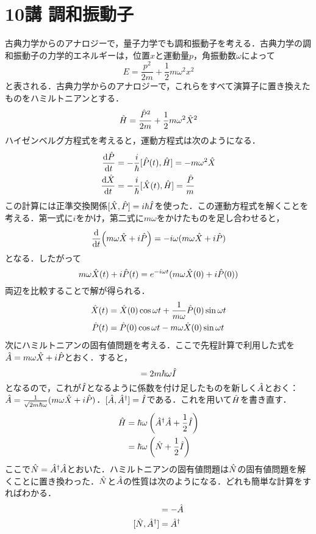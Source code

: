 \documentclass[a4paper,10pt,uplatex]{jsarticle}
\begin{document}
\section{10講 調和振動子}
古典力学からのアナロジーで，量子力学でも調和振動子を考える．古典力学の調和振動子の力学的エネルギーは，位置$x$と運動量$p$，角振動数$\omega$によって
\begin{equation}
    E = \frac{p^2}{2m} + \frac{1}{2} m\omega^2x^2
\end{equation}
と表される．古典力学からのアナロジーで，これらをすべて演算子に置き換えたものをハミルトニアンとする．
\begin{equation}
    \hat{H} = \frac{\hat{P}^2}{2m} + \frac{1}{2} m\omega^2\hat{X}^2
\end{equation}
ハイゼンベルグ方程式を考えると，運動方程式は次のようになる．
\begin{align}
    \dv{\hat{P}}{t} &= -\frac{i}{\hbar}[\hat{P}(t),\hat{H}] = -m\omega^2\hat{X} \\
    \dv{\hat{X}}{t} &= -\frac{i}{\hbar}[\hat{X}(t),\hat{H}] = \frac{\hat{P}}{m}
\end{align}
この計算には正準交換関係$[\hat{X}, \hat{P}] = i\hbar\hat{I}$を使った．この運動方程式を解くことを考える．第一式に$i$をかけ，第二式に$m\omega$をかけたものを足し合わせると，
\begin{equation}
    \dv{t}(m\omega\hat{X} + i\hat{P}) = -i\omega(m\omega\hat{X} + i\hat{P})
\end{equation}
となる．したがって
\begin{equation}
    m\omega\hat{X}(t) + i\hat{P}(t) = e^{-i\omega t}(m\omega\hat{X}(0) + i\hat{P}(0))
\end{equation}
両辺を比較することで解が得られる．
\begin{align}
    \hat{X}(t) &= \hat{X}(0)\cos{\omega t} + \frac{1}{m\omega}\hat{P}(0)\sin{\omega t} \\
    \hat{P}(t) &= \hat{P}(0)\cos{\omega t} - m\omega\hat{X}(0)\sin{\omega t}
\end{align}
次にハミルトニアンの固有値問題を考える．ここで先程計算で利用した式を$\hat{A} = m\omega\hat{X} + i\hat{P}$とおく．すると，
\begin{equation}
    [\A, \A^\dagger] = 2m\hbar\omega\I 
\end{equation}
となるので，これが$\hat{I}$となるように係数を付け足したものを新しく$\hat{A}$とおく：$\hat{A} = \frac{1}{\sqrt{2m\hbar\omega}}(m\omega\hat{X}+i\hat{P})$．$[\hat{A}, \hat{A}^\dagger] = \hat{I}$である．これを用いて$\hat{H}$を書き直す．
\begin{align}
    \hat{H} &= \hbar\omega\left(\hat{A}^\dagger\hat{A} + \frac{1}{2}\hat{I}\right) \\
    &= \hbar\omega\left(\hat{N} + \frac{1}{2}\hat{I}\right)
\end{align}
ここで$\hat{N} = \hat{A}^\dagger\hat{A}$とおいた．ハミルトニアンの固有値問題は$\hat{N}$の固有値問題を解くことに置き換わった．$\hat{N}$と$\hat{A}$の性質は次のようになる．どれも簡単な計算をすればわかる．
\begin{align}
    [\N, \A] &= -\A \\
    [\N, \A^\dagger] &= \A^\dagger
\end{align}
\end{document}
